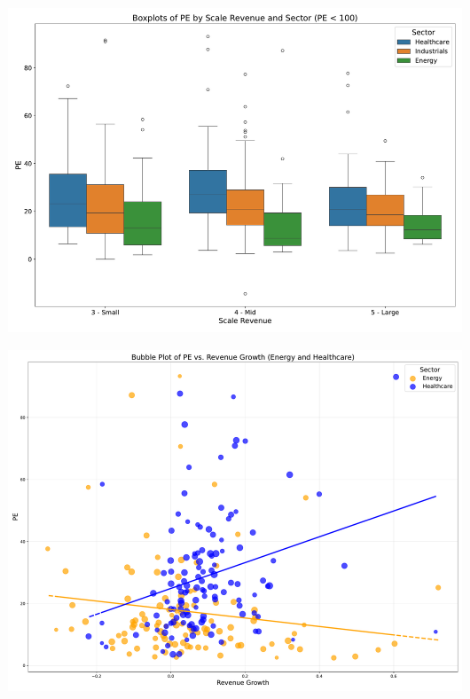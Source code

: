 \documentclass[10pt]{beamer}
\begin{document}
\begin{frame}[plain] 
  \begin{center}
  \includegraphics[width=0.9\textwidth]{financial_images/boxplot_pe_updated.pdf}
  \end{center}
\end{frame}

\begin{frame}[plain] 
  \begin{center}
  \includegraphics[width=0.9\textwidth]{financial_images/bubble_plot_energy_healthcare.pdf}
  \end{center}
\end{frame}
\end{document}
